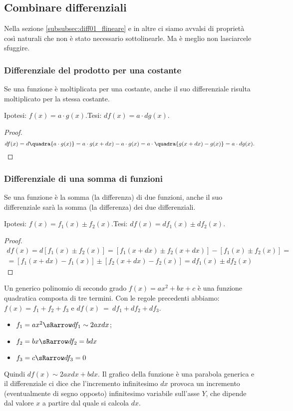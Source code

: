 \subsection{Combinare differenziali}
\label{subsec:diff01_combdiff}
Nella sezione \ref{subsubsec:diff01_flineare} e in altre ci siamo avvalsi 
di proprietà così naturali che non è stato necessario sottolinearle. 
Ma è meglio non lasciarcele sfuggire.

\subsubsection{Differenziale del prodotto per una costante}
\label{}
\begin{teorema}
 Se una funzione è moltiplicata per una costante, anche il suo 
 differenziale risulta moltiplicato per la stessa costante.
\end{teorema}
\noindent Ipotesi: $f(x)=a\cdot g(x)$.\tab Tesi: $df(x)=a\cdot dg(x)$.

\begin{proof}
\[
 df(x)=d\quadra{a\cdot g(x)}= a\cdot g(x+dx)-a\cdot 
g(x)=a\cdot\quadra{g(x+dx)-g(x)}
 =a\cdot dg(x).
\]
\end{proof}

\subsubsection{Differenziale di una somma di funzioni}
\label{}

\begin{teorema}
 Se una funzione è la somma (la differenza) di due funzioni, anche il suo 
 differenziale sarà la somma (la differenza) dei due differenziali.
\end{teorema}
\noindent Ipotesi: $f(x)=f_1(x)\pm f_2(x)$.\tab Tesi: $df(x)=df_1(x)\pm 
df_2(x)$.

\begin{proof}
\begin{align*}
 df(x)=d[f_1(x)\pm f_2(x)]=[f_1(x+dx)\pm f_2(x+dx)]-[f_1(x)\pm f_2(x)]=\\
 = [f_1(x+dx)-f_1(x)]\pm [f_2(x+dx)-f_2(x)]= df_1(x)\pm df_2(x)
\end{align*}
\end{proof}


\begin{esempio}
 Un generico polinomio di secondo grado \(f(x)=ax^2+bx+c\) è una
 funzione quadratica composta di tre termini. 
 Con le regole precedenti abbiamo: \(f(x)=f_1+f_2+f_3\) e
 \(df(x)~=~df_1+df_2+df_3\).
 \begin{itemize} [nosep, noitemsep]
  \item $f_1=ax^2 \sRarrow df_1\sim 2axdx$; 
  \item $f_2=bx \sRarrow df_2=bdx$
  \item $f_3=c \sRarrow df_3=0$
 \end{itemize}
Quindi $df(x)\sim 2axdx+bdx$. Il grafico della funzione è una parabola 
generica
e il differenziale ci dice che l'incremento infinitesimo 
$dx$ provoca un incremento (eventualmente di segno opposto) infinitesimo
variabile sull'asse $Y$, che dipende dal valore $x$ a partire dal quale si 
calcola $dx$.
\end{esempio}

